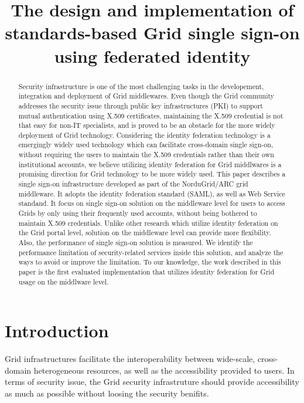 \documentclass[conference]{IEEEtran}
\begin{document}
\title{The design and implementation of standards-based Grid single sign-on using federated identity}

\author{
}

\maketitle


\begin{abstract}
Security infrastructure is one of the most challenging tasks in the developement, integration and
deployment of Grid middlewares. Even though the Grid community addresses the security issue 
through public key infrastructures (PKI) to support mutual authentication using X.509 certificates,
maintaining the X.509 credential is not that easy for non-IT specialists, and is proved to be an 
obstacle for the more widely deployment of Grid technology. Considering the identity federation 
technology is a emergingly widely used technology which can facilitate cross-domain single sign-on,
without requiring the users to maintain the X.509 credentials rather than their own institutional
accounts, we believe utilizing identity federation for Grid middlwares is a promising direction 
for Grid technology to be more widely used.
This paper describes a single sign-on infrastructure developed as part of the NorduGrid/ARC grid 
middleware. It adopts the identity federation standard (SAML), as well as Web Service standand. 
It focus on single sign-on solution on the middleware level for users to access Grids by only 
using their frequently used accounts, without being bothered to maintain X.509 credentials. 
Unlike other research which utilize identity federation on the Grid portal level, solution on
the middleware level can provide more flexibility.
Also, the performance of single sign-on solution is measured. We identify the performance limitation 
of security-related services inside this solution, and analyze the ways to avoid or improve the 
limitation. 
To our knowledge, the work described in this paper is the first evaluated implementation that utilizes 
identity federation for Grid usage on the middlware level.
\end{abstract}

\section{Introduction}
\label{sec:intro}
Grid infrastructures facilitate the interoperability between wide-scale, cross-domain heterogeneous 
resources, as well as the accessibility provided to users. In terms of security issue, the Grid security 
infrastruture should provide accessibility as much as possible without loosing the security benifits.
\end{document}
